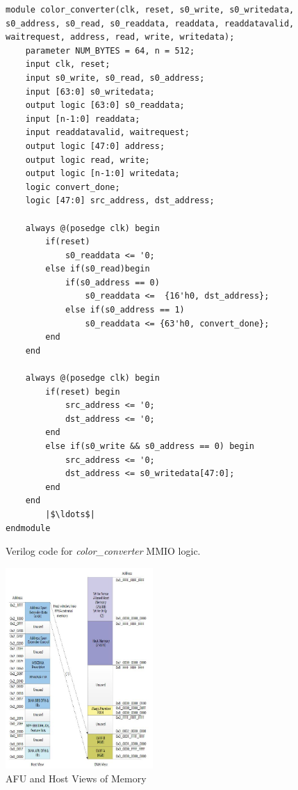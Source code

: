 \documentclass[11pt, twoside, pdftex]{article}
\begin{document}
\begin{figure}[H]
\begin{center}
\begin{minipage}[h]{\textwidth}
\begin{lstlisting}[name=color_converter]
module color_converter(clk, reset, s0_write, s0_writedata, s0_address, s0_read, s0_readdata, readdata, readdatavalid, waitrequest, address, read, write, writedata);
    parameter NUM_BYTES = 64, n = 512;
    input clk, reset;
    input s0_write, s0_read, s0_address;
    input [63:0] s0_writedata;
    output logic [63:0] s0_readdata;
    input [n-1:0] readdata;
    input readdatavalid, waitrequest;
    output logic [47:0] address;
    output logic read, write;
    output logic [n-1:0] writedata;
    logic convert_done;
    logic [47:0] src_address, dst_address;
    
    always @(posedge clk) begin
        if(reset)
            s0_readdata <= '0;
        else if(s0_read)begin
            if(s0_address == 0) 
                s0_readdata <=  {16'h0, dst_address};
            else if(s0_address == 1)
                s0_readdata <= {63'h0, convert_done};
        end
    end
    
    always @(posedge clk) begin
        if(reset) begin
            src_address <= '0;
            dst_address <= '0;
        end
        else if(s0_write && s0_address == 0) begin
            src_address <= '0;
            dst_address <= s0_writedata[47:0];
        end
    end
        |$\ldots$| 
endmodule
\end{lstlisting}
\end{minipage}
\caption{Verilog code for {\it color\_converter} MMIO logic.}
\label{fig:CSC_verilog}
\end{center}
\end{figure}

\begin{figure}[h]
    \centering
    \includegraphics[width=0.5\textwidth]{figures/DMAMemView.JPG}
    \caption{AFU and Host Views of Memory}
    \label{fig:dmaMemView}
\end{figure}
\end{document}
